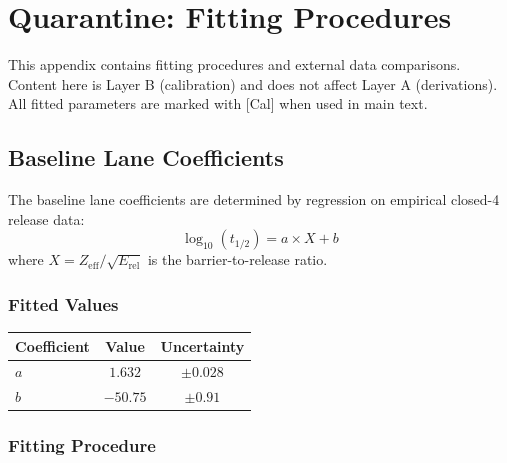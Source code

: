 
\chapter{Quarantine: Fitting Procedures}
\label{app:quarantine}

\begin{tcolorbox}[colback=red!5,colframe=red!70!black,title=Warning]
This appendix contains fitting procedures and external data comparisons.
Content here is Layer B (calibration) and does not affect Layer A (derivations).
All fitted parameters are marked with [Cal] when used in main text.
\end{tcolorbox}

\section{Baseline Lane Coefficients}
\label{sec:q:gn}

The baseline lane coefficients are determined by regression on empirical
closed-4 release data:
\begin{equation}
    \log_{10}(t_{1/2}) = a \times X + b
\end{equation}
where $X = Z_{\text{eff}}/\sqrt{E_{\text{rel}}}$ is the barrier-to-release ratio.

\subsection{Fitted Values}

\begin{center}
\begin{tabular}{lcc}
    \toprule
    Coefficient & Value & Uncertainty \\
    \midrule
    $a$ & $1.632$ & $\pm 0.028$ \\
    $b$ & $-50.75$ & $\pm 0.91$ \\
    \bottomrule
\end{tabular}
\end{center}

\subsection{Fitting Procedure}

